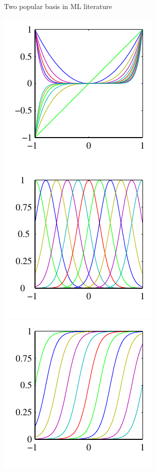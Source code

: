\documentclass[ignorenonframetext,aspectratio=169]{beamer}
\begin{document}
\begin{frame}{Two popular basis in ML literature}
\begin{center}\includegraphics[height=0.43\textheight]{./figs/Figure3_1a} \includegraphics[height=0.43\textheight]{./figs/Figure3_1b} \includegraphics[height=0.43\textheight]{./figs/Figure3_1c} \end{center}

\end{frame}
\end{document}
